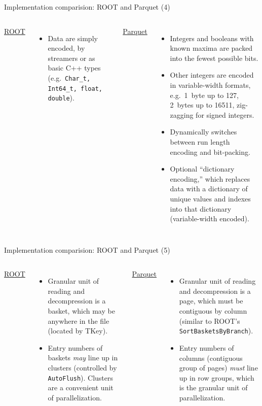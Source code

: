 \documentclass[aspectratio=169]{beamer}
\begin{document}
\begin{frame}{Implementation comparision: ROOT and Parquet (4)}
\vspace{0.5 cm}
\begin{columns}
{\large \underline{ROOT}}

\begin{itemize}
\item Data are simply encoded, by streamers or as basic C++ types (e.g.\ {\tt\small Char\_t, Int64\_t, float, double}).
\end{itemize}

{\large \underline{Parquet}}

\begin{itemize}
\item Integers and booleans with known maxima are packed into the fewest possible bits.

\item Other integers are encoded in variable-width formats, e.g.\ 1~byte up to 127, 2~bytes up to 16511, zig-zagging for signed integers.

\item Dynamically switches between run length encoding and bit-packing.

\item Optional ``dictionary encoding,'' which replaces data with a dictionary of unique values and indexes into that dictionary (variable-width encoded).
\end{itemize}
\end{columns}
\end{frame}

\begin{frame}{Implementation comparision: ROOT and Parquet (5)}
\vspace{0.5 cm}
\begin{columns}
{\large \underline{ROOT}}

\begin{itemize}
\item Granular unit of reading and decompression is a basket, which may be anywhere in the file (located by TKey).

\item Entry numbers of baskets {\it may} line up in clusters (controlled by {\tt\small AutoFlush}). Clusters are a convenient unit of parallelization.
\end{itemize}

{\large \underline{Parquet}}

\begin{itemize}
\item Granular unit of reading and decompression is a page, which must be contiguous by column (similar to ROOT's {\tt\small SortBasketsByBranch}).

\item Entry numbers of columns (contiguous group of pages) {\it must} line up in row groups, which is the granular unit of parallelization.
\end{itemize}
\end{columns}
\end{frame}
\end{document}
